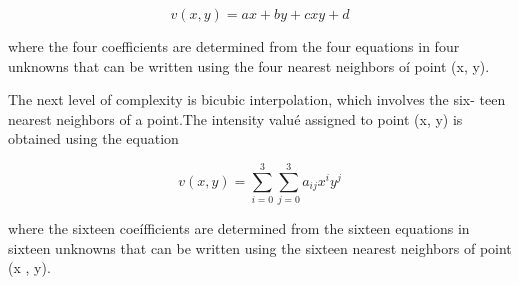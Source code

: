 \documentclass[letterpaper,14pts]{article}
\begin{document}
\begin{equation}\label{eq:bilinear}
v(x,y)=ax+by+cxy+d
\end{equation}

where the four coefficients are determined from the four equations in
four unknowns that can be written using the four nearest neighbors oí
point (x, y).

The next level of complexity is bicubic interpolation, which involves
the six- teen nearest neighbors of a point.The intensity valué assigned
to point (x, y) is obtained using the equation

\begin{equation}
v(x,y)=\sum_{i=0}^{3}\sum_{j=0}^{3}a_{ij}x^{i}y^{j}
\end{equation}

where the sixteen coeífficients are determined from the sixteen
equations in sixteen unknowns that can be written using the sixteen
nearest neighbors of point (x , y).
\end{document}
